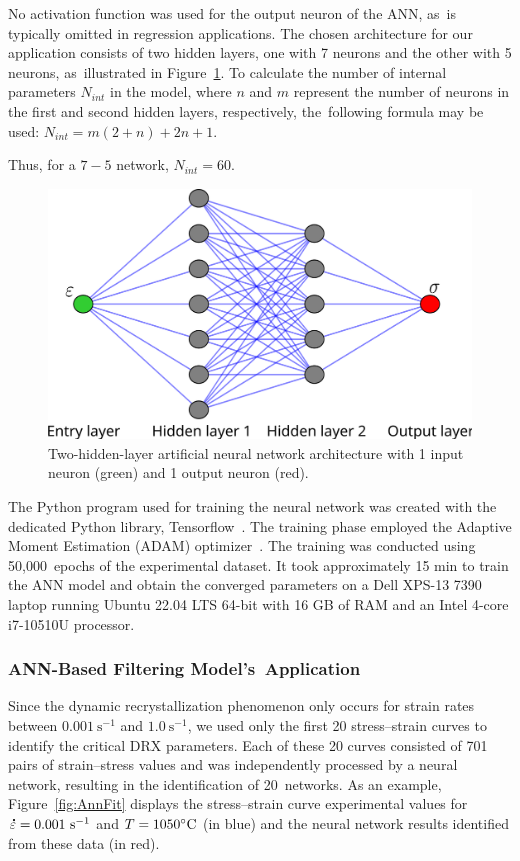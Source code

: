 \documentclass[metals,article,accept,pdftex,moreauthors]{Definitions/mdpi}
\DeclareRobustCommand{\mdot}[1]{\accentset{\mbox{\bfseries .}}{#1}}
\DeclareRobustCommand{\ps}{\text{s}^{-1}}
\begin{document}
No activation function was used for the output neuron of the ANN, as~is typically omitted in regression applications.
The chosen architecture for our application consists of two hidden layers, one with 7 neurons and the other with 5 neurons, as~illustrated in Figure~\ref{fig:ANN-7-5}.
To calculate the number of internal parameters $N_{int}$ in the model, where $n$ and $m$ represent the number of neurons in the first and second hidden layers, respectively, the~following formula may be used: $N_{int}=m(2+n)+2n+1$.

Thus, for a $7-5$ network, $N_{int}=60$.
\begin{figure}[H]
\centering
\includegraphics[width=0.7\columnwidth]{Figures/ANN-7-5}
\caption{Two-hidden-layer artificial neural network architecture with 1 input neuron (green) and 1 output neuron (red).}
\label{fig:ANN-7-5}
\end{figure}
The Python program used for training the neural network was created with the dedicated Python library, Tensorflow~\cite{Abadi-2016}.
The training phase employed the Adaptive Moment Estimation (ADAM) optimizer~\cite{Kingma-2015}.
The training was conducted using 50,000~epochs of the experimental dataset.
It took approximately 15 min to train the ANN model and obtain the converged parameters on a Dell XPS-13 7390 %
 laptop running Ubuntu 22.04 LTS 64-bit with 16 GB of RAM and an Intel 4-core i7-10510U processor.

\subsubsection{ANN-Based Filtering Model's~Application} \label{subsec:ANNapplication}

Since the dynamic recrystallization phenomenon only occurs for strain rates between $0.001~\ps$ and $1.0~\ps$, we used only the first 20 stress--strain curves to identify the critical DRX parameters.
Each of these 20 curves consisted of 701 pairs of strain--stress values and was independently processed by a neural network, resulting in the identification of 20~networks.
As an example, Figure~\ref{fig:AnnFit} displays the stress--strain curve experimental values for $\mdot\varepsilon=0.001~\ps$ and $T=1050\celsius$ (in blue) and the neural network results identified from these data (in red).
\end{document}
